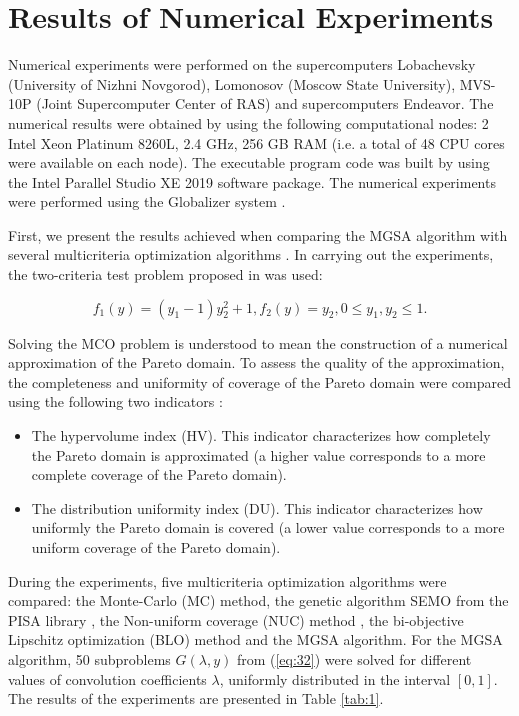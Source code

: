 \documentclass[review]{elsarticle}
\begin{document}
\section{Results of Numerical Experiments}\label{sec:5}

Numerical experiments were performed on the supercomputers Lobachevsky (University of Nizhni Novgorod), Lomonosov (Moscow State University), MVS-10P (Joint Supercomputer Center of RAS) and supercomputers Endeavor. The numerical results were obtained by using the following computational nodes: 2 Intel Xeon Platinum 8260L, 2.4 GHz, 256 GB RAM (i.e. a total of 48 CPU cores were available on each node). The executable program code was built by using the Intel Parallel Studio XE 2019 software package. The numerical experiments were performed using the Globalizer system \cite{c40}.

First, we present the results achieved when comparing the MGSA algorithm with several multicriteria optimization algorithms \cite{c37}. In carrying out the experiments, the two-criteria test problem proposed in \cite{c36} was used:

\begin{equation}\label{eq:32}
f_1(y)=(y_1-1) y_2^2+1,f_2 (y)=y_2, 0 \leq y_1, y_2 \leq 1.
\end{equation}

Solving the MCO problem is understood to mean the construction of a numerical approximation of the Pareto domain. To assess the quality of the approximation, the completeness and uniformity of coverage of the Pareto domain were compared using the following two indicators \cite{c15,c36}:
\begin{itemize}
	 \item The hypervolume index (HV). This indicator characterizes how completely the Pareto domain is approximated (a higher value corresponds to a more complete coverage of the Pareto domain). 
	 \item The distribution uniformity index (DU). This indicator characterizes how uniformly the Pareto domain is covered (a lower value corresponds to a more uniform coverage of the Pareto domain).
\end{itemize}

During the experiments, five multicriteria optimization algorithms were compared: the Monte-Carlo (MC) method, the genetic algorithm SEMO from the PISA library \cite{c37,c38}, the Non-uniform coverage (NUC) method \cite{c36}, the bi-objective Lipschitz optimization (BLO) method \cite{c37} and the MGSA algorithm. For the MGSA  algorithm, 50 subproblems $G(\lambda, y)$ from (\ref{eq:32}) were solved for different values of convolution coefficients $\lambda$, uniformly distributed in the interval $[0,1]$. The results of the experiments are presented in Table \ref{tab:1}.
\end{document}
